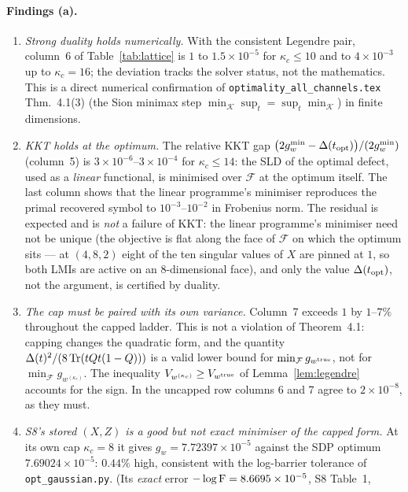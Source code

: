 \documentclass[11pt]{article}
\begin{document}
\paragraph{Findings (a).}
\begin{enumerate}[leftmargin=1.6em,itemsep=2pt]
\item \emph{Strong duality holds numerically.}  With the consistent Legendre pair, column~6 of
Table~\ref{tab:lattice} is $1$ to $1.5\times10^{-5}$ for $\kappa_c\le10$ and to
$4\times10^{-3}$ up to $\kappa_c=16$; the deviation tracks the solver status, not the
mathematics.  This is a direct numerical confirmation of
\texttt{optimality\_all\_channels.tex} Thm.~4.1(3) (the Sion minimax step
$\min_{\mathcal K}\sup_t=\sup_t\min_{\mathcal K}$) in finite dimensions.
\item \emph{KKT holds at the optimum.}  The relative KKT gap
$\bigl(2g_w^{\min}-\Delta(t_{\rm opt})\bigr)/(2g_w^{\min})$ (column~5) is
$3\times10^{-6}$--$3\times10^{-4}$ for $\kappa_c\le14$: the SLD of the optimal defect, used as a
\emph{linear} functional, is minimised over $\mathcal F$ at the optimum itself.  The last column
shows that the linear programme's minimiser reproduces the primal recovered symbol to
$10^{-3}$--$10^{-2}$ in Frobenius norm.  The residual is expected and is \emph{not} a failure of
KKT: the linear programme's minimiser need not be unique (the objective is flat along the
face of $\mathcal F$ on which the optimum sits --- at $(4,8,2)$ eight of the ten singular values
of $X$ are pinned at $1$, so both LMIs are active on an $8$-dimensional face), and only the value
$\Delta(t_{\rm opt})$, not the argument, is certified by duality.
\item \emph{The cap must be paired with its own variance.}  Column~7 exceeds $1$ by
$1$--$7\%$ throughout the capped ladder.  This is not a violation of Theorem~4.1: capping changes
the quadratic form, and the quantity $\Delta(t)^2/(8\operatorname{Tr}(tQt(1-Q)))$ is a valid lower bound for
$\min_{\mathcal F}g_{w^{\rm true}}$, not for $\min_{\mathcal F}g_{w^{(\kappa_c)}}$.  The
inequality $V_{w^{(\kappa_c)}}\ge V_{w^{\rm true}}$ of Lemma~\ref{lem:legendre} accounts for the
sign.  In the uncapped row columns 6 and 7 agree to $2\times10^{-8}$, as they must.
\item \emph{S8's stored $(X,Z)$ is a good but not exact minimiser of the capped form.}
At its own cap $\kappa_c=8$ it gives $g_w=7.72397\times10^{-5}$ against the SDP optimum
$7.69024\times10^{-5}$: $0.44\%$ high, consistent with the log-barrier tolerance of
\texttt{opt\_gaussian.py}.  (Its \emph{exact} error $-\log\operatorname{F}=8.6695\times10^{-5}$, S8 Table~1,

\end{enumerate}
\end{document}
